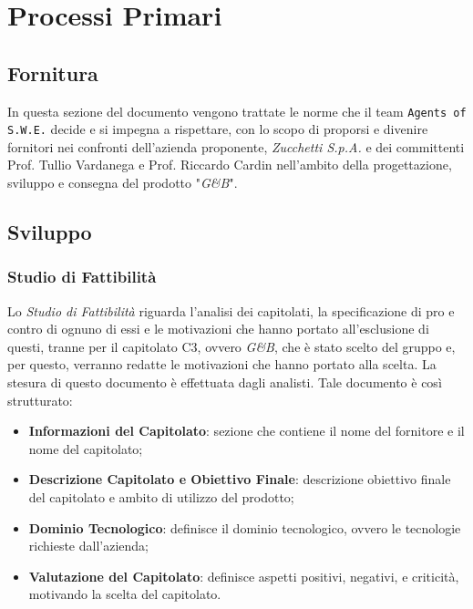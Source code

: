 \section{Processi Primari}\label{ProcessiPrimari}

\subsection{Fornitura}
In questa sezione del documento vengono trattate le norme che il team \texttt{Agents of S.W.E.} decide e si impegna a rispettare, con lo scopo di proporsi e divenire fornitori nei confronti dell'azienda proponente, \textit{Zucchetti S.p.A.} e dei committenti Prof. Tullio Vardanega e Prof. Riccardo Cardin nell'ambito della progettazione, sviluppo e consegna del prodotto "\textit{G\&B}".

\subsection{Sviluppo}\label{Sviluppo}
\subsubsection{Studio di Fattibilità} \label{ProcessiPrimari_Sviluppo_StudioFattibilità}
Lo \textit{Studio di Fattibilità} riguarda l'analisi dei capitolati, la specificazione di pro e contro di ognuno di essi e le motivazioni che hanno portato all'esclusione di questi, tranne per il capitolato C3, ovvero \textit{G\&B}, che è stato scelto del gruppo e, per questo, verranno redatte le motivazioni che hanno portato alla scelta. La stesura di questo documento è effettuata dagli analisti.
Tale documento è così strutturato:
\begin{itemize}
	\item \textbf{Informazioni del Capitolato}: sezione che contiene il nome del fornitore e il nome del capitolato;
	\item \textbf{Descrizione Capitolato e Obiettivo Finale}: descrizione obiettivo finale del capitolato e ambito di utilizzo del prodotto;
	\item \textbf{Dominio Tecnologico}: definisce il dominio tecnologico, ovvero le tecnologie richieste dall'azienda;
	\item \textbf{Valutazione del Capitolato}: definisce aspetti positivi, negativi, e criticità, motivando la scelta del capitolato.
\end{itemize}

